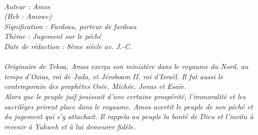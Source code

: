 \BFont
\noindent\hrulefill
{\footnotesize
\textit{
\bigskip
{\centering{}
\\Auteur : Amos
\\(Heb : Amowc)
\\Signification : Fardeau, porteur de fardeau
\\Thème : Jugement sur le péché
\\Date de rédaction : 8ème siècle av. J.-C.\\}
}
\textit{
\\Originaire de Tekoa, Amos exerça son ministère dans le royaume du Nord, au temps d’Ozias, roi de Juda, et Jéroboam II, roi d’Israël. Il fut aussi le contemporain des prophètes Osée, Michée, Jonas et Esaïe.
\\Alors que le peuple juif jouissait d’une certaine prospérité, l’immoralité et les sacrilèges prirent place dans le royaume. Amos avertit le peuple de son péché et du jugement qui s’y attachait. Il rappela au peuple la bonté de Dieu et l’invita à revenir à Yahweh et à lui demeurer fidèle.\bigskip
}
}
\par\nobreak\noindent\hrulefill

